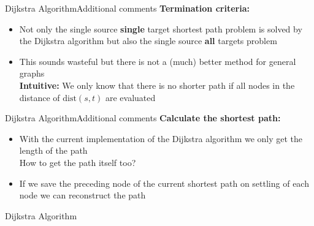 \begin{frame}{Dijkstra Algorithm}{Additional comments}
  \textbf{Termination criteria:}
  \begin{itemize}
    \item
      Not only the {\color{MainA}single source \textbf{single} target}
      shortest path problem is solved by the Dijkstra algorithm but also the
      {\color{MainA}single source \textbf{all} targets} problem
    \item
      This sounds wasteful but there is not a (much) better method for general
      graphs\\
      \textbf{Intuitive:} We only know that there is no shorter path if
      all nodes in the distance of {\color{MainA}$\mathrm{dist}(s, t)$} are
      evaluated
  \end{itemize}
\end{frame}


\begin{frame}{Dijkstra Algorithm}{Additional comments}
  \textbf{Calculate the shortest path:}
  \begin{itemize}
    \item
      With the current implementation of the Dijkstra algorithm we only get
      the {\color{MainA}length} of the path\\
      {\color{gray}How to get the path itself too?}
    \item
      If we save the preceding node of the current shortest path on
      {\color{MainA}settling} of each node we can reconstruct the
      {\color{MainA}path}
  \end{itemize}
\end{frame}


\begin{frame}{Dijkstra Algorithm}
  \vspace{-1em}
  \begin{figure}[!h]
    \begin{adjustbox}{width=\linewidth}
      \def\DijkstraReverse{1}%
      
    \end{adjustbox}
    \vspace{-2em}
    \caption{%
    }
  \end{figure}
\end{frame}

